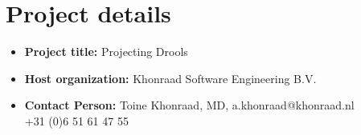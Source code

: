 \section*{Project details}

\begin{itemize}
    \item \textbf{Project title:} Projecting Drools
    \item \textbf{Host organization:} Khonraad Software Engineering B.V.
    \item \textbf{Contact Person:} Toine Khonraad, MD, a.khonraad@khonraad.nl\\ +31 (0)6 51 61 47 55
\end{itemize}